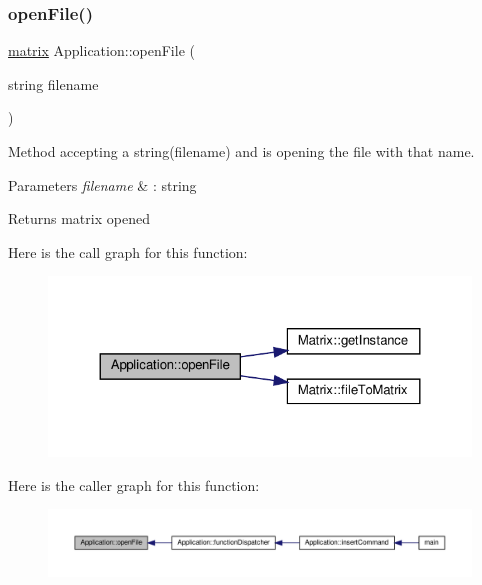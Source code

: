 \subsubsection{\texorpdfstring{open\+File()}{openFile()}}
{\footnotesize\ttfamily \hyperlink{formula_8h_a869e2a5deeb3daa4c82d6bc91cf20d92}{matrix} Application\+::open\+File (\begin{DoxyParamCaption}\item[{string}]{filename }\end{DoxyParamCaption})\hspace{0.3cm}{\ttfamily [private]}}

Method accepting a string(filename) and is opening the file with that name. 
\begin{DoxyParams}{Parameters}
{\em filename} & \+: string \\
\hline
\end{DoxyParams}
\begin{DoxyReturn}{Returns}
matrix opened 
\end{DoxyReturn}
Here is the call graph for this function\+:
\nopagebreak
\begin{figure}[H]
\begin{center}
\leavevmode
\includegraphics[width=324pt]{class_application_ab2f161414a4e2f16e28321c192051006_cgraph}
\end{center}
\end{figure}
Here is the caller graph for this function\+:
\nopagebreak
\begin{figure}[H]
\begin{center}
\leavevmode
\includegraphics[width=350pt]{class_application_ab2f161414a4e2f16e28321c192051006_icgraph}
\end{center}
\end{figure}
\mbox{\label{class_application_a2bc1937440cb9e71dace95c3fe7ed4ea}} 

